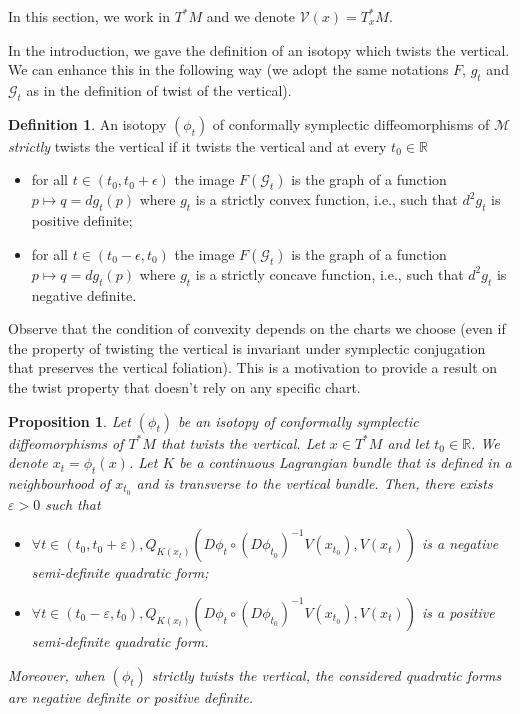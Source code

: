 \documentclass[10pt,a4paper]{amsart}
\numberwithin{equation}{section}
\newcommand*\M{\mathcal{M}}
\newcommand*\cg{\mathcal{G}}
\newcommand*\cal{\mathcal}
\newcommand*\R{\mathbb{R}}
\let\oldforall\forall
\renewcommand*{\forall}{\mathrel{\oldforall}}
\newtheorem{prop}[theo]{Proposition}
\theoremstyle{definition}
\newtheorem{defi}[theo]{Definition}
\theoremstyle{remark}
\begin{document}
In this section, we work in $T^*M$ and we denote ${\cal V}(x)=T_x^*M$.

In the introduction, we gave the definition of an isotopy which twists the vertical. We can enhance this in the following way (we adopt the same notations $F$, $g_t$ and $\cg_t$ as in the definition of twist of the vertical).

\begin{defi}
An isotopy $(\phi_t)$ of conformally symplectic diffeomorphisms of $\M$ \emph{strictly} twists the vertical if it twists the vertical and at every $t_0\in\R$
\begin{itemize}
\item for all $t\in(t_0,t_0+\epsilon)$ the image $F(\cg_t)$ is the graph of a function $p\mapsto q=dg_t(p)$ where $g_t$ is a strictly convex function, i.e., such that $d^2g_t$ is positive definite;
\item for all $t\in(t_0-\epsilon,t_0)$ the image $F(\cg_t)$ is the graph of a function $p\mapsto q=dg_t(p)$ where $g_t$ is a strictly concave function, i.e., such that $d^2g_t$ is negative definite.
\end{itemize}
\end{defi}




Observe that the condition of convexity depends on the charts we choose (even if the property of twisting the vertical is invariant under symplectic conjugation that preserves the vertical foliation). This is a motivation to provide a result on the twist property that doesn't rely on any specific chart.

\begin{prop}\label{Ptwistintrinsec}
Let $(\phi_t)$ be an isotopy of conformally symplectic diffeomorphisms of $T^*M$ that twists the vertical. Let $x\in T^*M$ and let $t_0\in\R$. We denote $x_t=\phi_t(x)$. Let $K$ be a continuous Lagrangian bundle that is defined in a neighbourhood of $x_{t_0}$ and is transverse to the vertical bundle. Then, there exists $\varepsilon>0$ such that
\begin{itemize}
\item $\forall t\in (t_0, t_0+\varepsilon), Q_{K(x_t)}(D\phi_t\circ (D\phi_{t_0})^{-1}V(x_{t_0}), V(x_t)) $ is a negative semi-definite quadratic form;
\item $\forall t\in (t_0-\varepsilon, t_0), Q_{K(x_t)}(D\phi_t\circ (D\phi_{t_0})^{-1}V(x_{t_0}), V(x_t)) $ is a positive semi-definite quadratic form.
\end{itemize}
Moreover, when $(\phi_t)$ strictly twists the vertical, the considered quadratic forms are negative definite or positive definite.
\end{prop}
\end{document}
